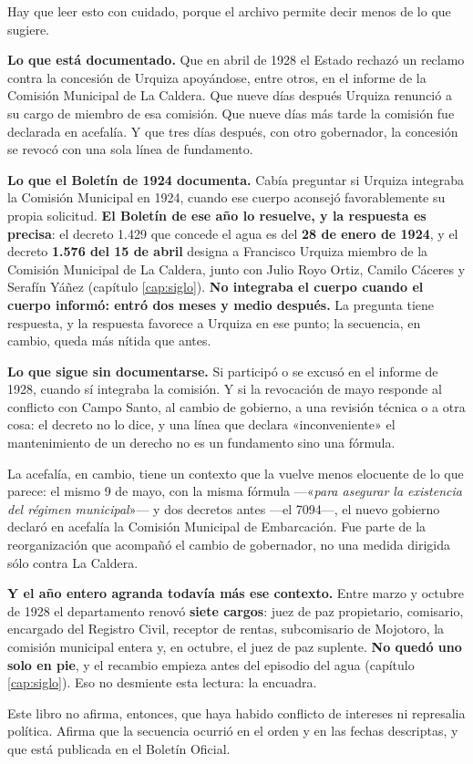 \begin{cautela}
Hay que leer esto con cuidado, porque el archivo permite decir menos de lo que sugiere.

\textbf{Lo que está documentado.} Que en abril de 1928 el Estado rechazó un reclamo contra
la concesión de Urquiza apoyándose, entre otros, en el informe de la Comisión Municipal de
La Caldera. Que nueve días después Urquiza renunció a su cargo de miembro de esa comisión.
Que nueve días más tarde la comisión fue declarada en acefalía. Y que tres días después, con
otro gobernador, la concesión se revocó con una sola línea de fundamento.

\textbf{Lo que el Boletín de 1924
documenta.} Cabía preguntar si Urquiza
integraba la Comisión Municipal en 1924, cuando ese cuerpo aconsejó favorablemente su propia
solicitud. \textbf{El Boletín de ese año lo resuelve, y la respuesta es precisa}: el decreto
1.429 que concede el agua es del \textbf{28 de enero de 1924}, y el decreto \textbf{1.576 del 15
de abril} designa a Francisco Urquiza miembro de la Comisión
Municipal de La Caldera, junto con Julio Royo Ortiz, Camilo Cáceres y Serafín Yáñez (capítulo
\ref{cap:siglo}). \textbf{No integraba el cuerpo cuando el cuerpo informó: entró dos meses y
medio después.} La pregunta tiene respuesta, y la respuesta
favorece a Urquiza en ese punto; la secuencia, en cambio, queda más nítida que antes.

\textbf{Lo que sigue sin documentarse.} Si participó o se excusó en el informe de 1928, cuando
sí integraba la comisión. Y si la revocación de mayo
responde al conflicto con Campo Santo, al cambio de gobierno, a una revisión técnica o a
otra cosa: el decreto no lo dice, y una línea que declara «inconveniente» el mantenimiento
de un derecho no es un fundamento sino una fórmula.

La acefalía, en cambio, tiene un contexto que la vuelve menos elocuente de lo que parece: el mismo 9 de mayo, con la misma fórmula ---«\textit{para asegurar la existencia del régimen municipal}»--- y dos decretos antes ---el 7094---, el nuevo gobierno declaró en acefalía la Comisión Municipal de Embarcación. Fue parte de la reorganización que acompañó el cambio de gobernador, no una medida dirigida sólo contra La Caldera.

\textbf{Y el año entero agranda todavía más ese contexto.} Entre marzo y octubre de 1928 el departamento renovó \textbf{siete cargos}: juez de paz propietario, comisario, encargado del Registro Civil, receptor de rentas, subcomisario de Mojotoro, la comisión municipal entera y, en octubre, el juez de paz suplente. \textbf{No quedó uno solo en pie}, y el recambio empieza antes del episodio del agua (capítulo \ref{cap:siglo}). Eso no desmiente esta lectura: la encuadra.

Este libro no afirma, entonces, que haya habido conflicto de intereses ni represalia
política. Afirma que la secuencia ocurrió en el orden y en las fechas descriptas, y que
está publicada en el Boletín Oficial.
\end{cautela}

